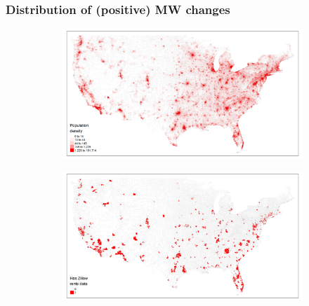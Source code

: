 \documentclass[aspectratio=169, t]{beamer}
\begin{document}
\begin{frame}[label=dist_mw_changes]
	\frametitle{Distribution of (positive) MW changes}
	\begin{figure}
		\begin{subfigure}{0.40\textwidth}
				\includegraphics[scale = 0.32]{maps_US/output/USPS_zipcodes_pop_density.png}
			\end{subfigure}%
		\quad\quad\quad\quad\quad\quad
		\begin{subfigure}{0.40\textwidth}
			\includegraphics[scale = 0.32]{maps_US/output/USPS_zipcodes_zillow_data.png}
		\end{subfigure}
	\end{figure}
	
	\hyperlink{stat_MW}{}
\end{frame}
\end{document}
